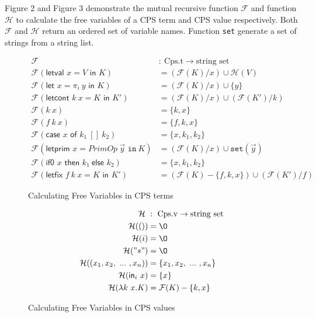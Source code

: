 \documentclass{article}
\theoremstyle{definition}
\theoremstyle{remark}
\numberwithin{equation}{section}
\begin{document}
Figure 2 and Figure 3 demonstrate the mutual recursive function $\mathcal{F}$ and
function $\mathcal{H}$ to calculate the free variables of a CPS term and CPS value
respectively. Both $\mathcal{F}$ and $\mathcal{H}$ return an ordered set of
 variable names. Function \texttt{set} generate a set of strings from a string list.\\

\begin{figure}[!ht]
  \centering
\begin{align*}
\mathcal{F}\ &:\ \textrm{Cps.t} \to \textrm{string set}\\     %
\mathcal{F}(\textsf{letval }x=V\textsf{ in }K)
    &=(\mathcal{F}(K)/x)\cup \mathcal{H}(V)\\   %
\mathcal{F}(\textsf{let }x=\pi _i\ y\textsf{ in }K)
    &=(\mathcal{F}(K)/x)\cup \{y\}\\   %
\mathcal{F}(\textsf{letcont }k\ x=K\textsf{ in }K')
    &=(\mathcal{F}(K)/x)\cup (\mathcal{F}(K')/k)\\   %
\mathcal{F}(k\ x)
    &=\{k, x\}\\   %
\mathcal{F}(f\ k\ x)
    &=\{f, k, x\}\\   %
\mathcal{F}(\textsf{case }x\textsf{ of }k_1\ [\!]\ k_2)
    &=\{x, k_1, k_2\}\\   %
\mathcal{F}(\textsf{letprim }x=PrimOp\ \vec{y}\texttt{ in}\ K)
    &=(\mathcal{F}(K)/x)\cup \texttt{set}(\vec{y})\\   %
\mathcal{F}(\textsf{if0 }x\textsf{ then }k_1\ \textsf{else }k_2)
    &=\{x, k_1, k_2\}\\   %
\mathcal{F}(\textsf{letfix }f\ k\ x=K\textsf{ in }K')
    &=(\mathcal{F}(K)-\{f,k,x\})\cup (\mathcal{F}(K')/f)   %
\end{align*}
  \caption{Calculating Free Variables in CPS terms}
  \label{fig-sub}
\end{figure}

\begin{figure}[!ht]
  \centering
\begin{align*}
\mathcal{H}\ &:\ \textrm{Cps.v} \to \textrm{string set}\\     %
\mathcal{H}(()) &={\O}\\   %
\mathcal{H}(i) &={\O}\\   %
\mathcal{H}("s") &={\O}\\   %
\mathcal{H}((x_1, x_2,\ ...\ , x_n)) &=\{x_1, x_2,\ ...\ , x_n\}\\   %
\mathcal{H}(\textsf{in}_i\ x) &= \{x\}\\        %
\mathcal{H}(\lambda k\ x.K) &= \mathcal{F}(K)-\{k, x\}      %
\end{align*}
  \caption{Calculating Free Variables in CPS values}
  \label{fig-sub}
\end{figure}
\end{document}
